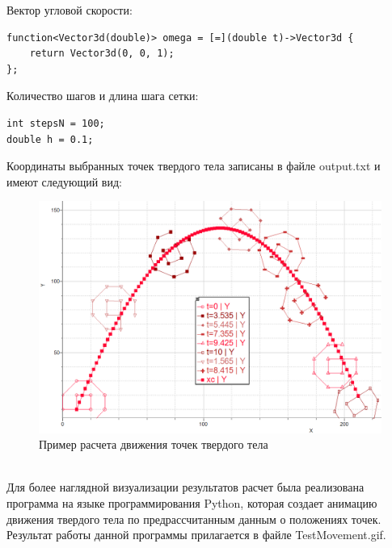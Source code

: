 \documentclass[12pt,a4paper]{article}
\begin{document}
Вектор угловой скорости:
\begin{lstlisting}
function<Vector3d(double)> omega = [=](double t)->Vector3d {
    return Vector3d(0, 0, 1);
};
\end{lstlisting}
Количество шагов и длина шага сетки:
\begin{lstlisting}
int stepsN = 100;
double h = 0.1;
\end{lstlisting}
Координаты выбранных точек твердого тела записаны в файле output.txt и имеют следующий вид:
\begin{figure}[h!]
  \includegraphics[width=\linewidth]{Pictures/xki_parabolic_12points.png}
  \caption{Пример расчета движения точек твердого тела}
  \label{fig:xki}
\end{figure}
\\Для более наглядной визуализации результатов расчет была реализована программа на языке программирования Python, которая создает анимацию движения твердого тела по предрассчитанным данным о положениях точек.
Результат работы данной программы прилагается в файле TestMovement.gif.
\end{document}
